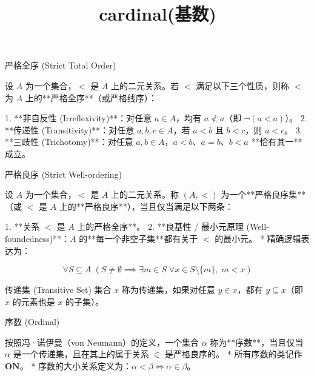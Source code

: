 \documentclass{beamer}
\title{cardinal(基数)}
\date{}
\begin{document}
\begin{frame}
    \titlepage
\end{frame}

\begin{frame}[fragile]{严格全序 (Strict Total Order)}
\begin{markdown}
设 $A$ 为一个集合，$<$ 是 $A$ 上的二元关系。若 $<$ 满足以下三个性质，则称 $<$ 为 $A$ 上的**严格全序**（或严格线序）：

1. **非自反性 (Irreflexivity)**：对任意 $a \in A$，均有 $a \nless a$（即 $\neg(a < a)$）。
2. **传递性 (Transitivity)**：对任意 $a, b, c \in A$，若 $a < b$ 且 $b < c$，则 $a < c$。
3. **三歧性 (Trichotomy)**：对任意 $a, b \in A$，$a < b$、$a = b$、$b < a$ **恰有其一**成立。
\end{markdown}
\end{frame}

\begin{frame}[fragile]{严格良序 (Strict Well-ordering)}
\begin{markdown}
设 $A$ 为一个集合，$<$ 是 $A$ 上的二元关系。称 $(A, <)$ 为一个**严格良序集**（或 $<$ 是 $A$ 上的**严格良序**），当且仅当满足以下两条：

1. **关系 $<$ 是 $A$ 上的严格全序**。
2. **良基性 / 最小元原理 (Well-foundedness)**：$A$ 的**每一个非空子集**都有关于 $<$ 的最小元。
* 精确逻辑表达为：

$$\forall S \subseteq A \; (S \neq \emptyset \implies \exists m \in S \; \forall x \in S \setminus \{m\}, \; m < x)$$
\end{markdown}
\end{frame}

\begin{frame}{传递集 (Transitive Set)}
集合 $x$ 称为传递集，如果对任意 $y \in x$，都有 $y \subseteq x$（即 $x$ 的元素也是 $x$ 的子集）。
\end{frame}

\begin{frame}[fragile]{序数 (Ordinal)}
\begin{markdown}
按照冯·诺伊曼（von Neumann）的定义，一个集合 $\alpha$ 称为**序数**，当且仅当 $\alpha$ 是一个传递集，且在其上的属于关系 $\in$ 是严格良序的。
* 所有序数的类记作 $\mathbf{ON}$。
* 序数的大小关系定义为：$\alpha < \beta \iff \alpha \in \beta$。
\end{markdown}
\end{frame}
\end{document}
